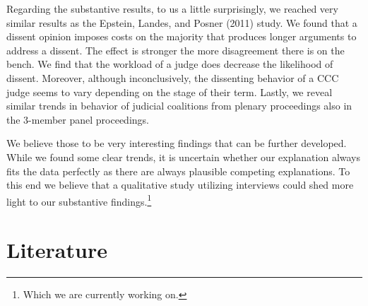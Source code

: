 \documentclass[
  11pt,
]{article}
\begin{document}
Regarding the substantive results, to us a little surprisingly, we
reached very similar results as the Epstein, Landes, and Posner (2011)
study. We found that a dissent opinion imposes costs on the majority
that produces longer arguments to address a dissent. The effect is
stronger the more disagreement there is on the bench. We find that the
workload of a judge does decrease the likelihood of dissent. Moreover,
although inconclusively, the dissenting behavior of a CCC judge seems to
vary depending on the stage of their term. Lastly, we reveal similar
trends in behavior of judicial coalitions from plenary proceedings also
in the 3-member panel proceedings.

We believe those to be very interesting findings that can be further
developed. While we found some clear trends, it is uncertain whether our
explanation always fits the data perfectly as there are always plausible
competing explanations. To this end we believe that a qualitative study
utilizing interviews could shed more light to our substantive
findings.\footnote{Which we are currently working on.}

\vspace{30pt}

\hypertarget{literature}{%
\section*{Literature}\label{literature}}
\end{document}
